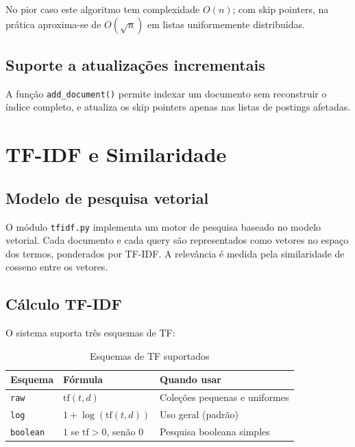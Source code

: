 \documentclass[12pt,a4paper]{article}
\begin{document}
No pior caso este algoritmo tem complexidade $O(n)$; com skip pointers, na prática aproxima-se de $O(\sqrt{n})$ em listas uniformemente distribuídas.

\subsection{Suporte a atualizações incrementais}

A função \texttt{add\_document()} permite indexar um documento sem reconstruir o índice completo, e atualiza os skip pointers apenas nas listas de postings afetadas.

\section{TF-IDF e Similaridade}

\subsection{Modelo de pesquisa vetorial}

O módulo \texttt{tfidf.py} implementa um motor de pesquisa baseado no modelo vetorial. Cada documento e cada query são representados como vetores no espaço dos termos, ponderados por TF-IDF. A relevância é medida pela similaridade de cosseno entre os vetores.

\subsection{Cálculo TF-IDF}

O sistema suporta três esquemas de TF:

\begin{table}[H]
\centering
\caption{Esquemas de TF suportados}
\begin{tabular}{@{}lll@{}}
\toprule
\textbf{Esquema} & \textbf{Fórmula} & \textbf{Quando usar} \\
\midrule
\texttt{raw}     & $\mathrm{tf}(t,d)$ & Coleções pequenas e uniformes \\
\texttt{log}     & $1 + \log(\mathrm{tf}(t,d))$ & Uso geral (padrão) \\
\texttt{boolean} & $1$ se $\mathrm{tf}>0$, senão $0$ & Pesquisa booleana simples \\
\bottomrule
\end{tabular}
\end{table}
\end{document}
